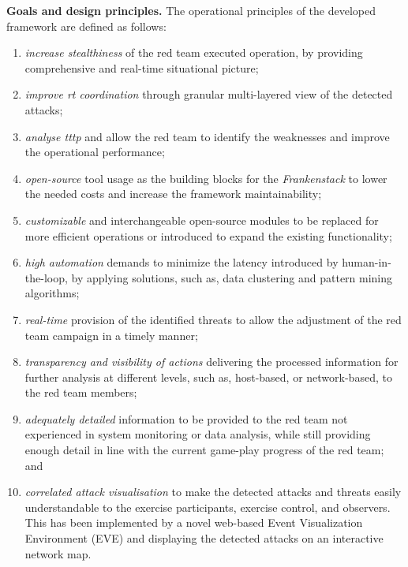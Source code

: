 \textbf{Goals and design principles.}
The operational principles of the developed framework are defined as follows:
\begin{enumerate}
    \item \textit{increase stealthiness} of the red team executed operation, by providing comprehensive and real-time situational picture;
    \item \textit{improve \gls{rt} coordination} through granular multi-layered view of the detected attacks;
    \item \textit{analyse \gls{tttp}} and allow the red team to identify the weaknesses and improve the operational performance;
    \item \textit{open-source} tool usage as the building blocks for the \textit{Frankenstack} to lower the needed costs and increase the framework maintainability;
    \item \textit{customizable} and interchangeable open-source modules to be replaced for more efficient operations or introduced to expand the existing functionality;
    \item \textit{high automation} demands to minimize the latency introduced by human-in-the-loop, by applying solutions, such as, data clustering and pattern mining algorithms;
    \item \textit{real-time} provision of the identified threats to allow the adjustment of the red team campaign in a timely manner;
    \item \textit{transparency and visibility of actions} delivering the processed information for further analysis at different levels, such as, host-based, or network-based, to the red team members;
    \item \textit{adequately detailed} information to be provided to the red team not experienced in system monitoring or data analysis, while still providing enough detail in line with the current game-play progress of the red team; and
    \item \textit{correlated attack visualisation} to make the detected attacks and threats easily understandable to the exercise participants, exercise control, and observers. This has been implemented by a novel web-based Event Visualization Environment (EVE) and displaying the detected attacks on an interactive network map.
\end{enumerate}

